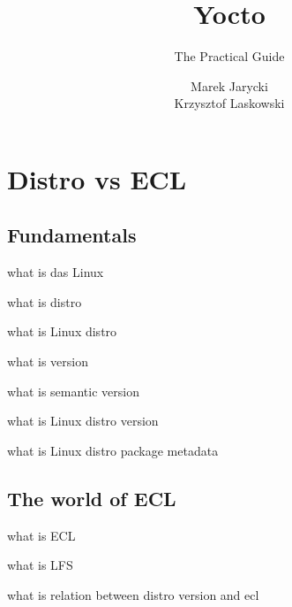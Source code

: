 \documentclass{beamer}
\title[Yocto: The Practical Guide]{Yocto}
\subtitle{The Practical Guide}
\author[M. Jarycki, K. Laskowski]{
    Marek Jarycki \\
    Krzysztof Laskowski
}
\begin{document}
\begin{frame}
    \titlepage
\end{frame}

\begin{frame}
    \tableofcontents
\end{frame}

\section{Distro vs ECL}

\subsection{Fundamentals}

\begin{frame}
    what is das Linux
\end{frame}

\begin{frame}
    what is distro
\end{frame}

\begin{frame}
    what is Linux distro
\end{frame}

\begin{frame}
    what is version
\end{frame}

\begin{frame}
    what is semantic version
\end{frame}

\begin{frame}
    what is Linux distro version
\end{frame}

\begin{frame}
    what is Linux distro package metadata
\end{frame}

\subsection{The world of ECL}

\begin{frame}
    what is ECL
\end{frame}

\begin{frame}
    what is LFS
\end{frame}

\begin{frame}
    what is relation between distro version and ecl
\end{frame}
\end{document}
